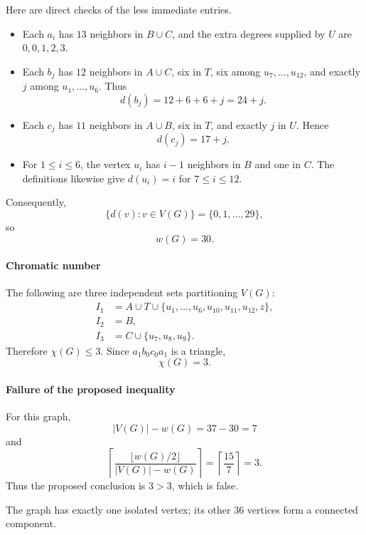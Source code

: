 \documentclass[
  11pt,
  a4paper,
]{article}
\providecommand{\tightlist}{%
  \setlength{\itemsep}{0pt}\setlength{\parskip}{0pt}}
\begin{document}
Here are direct checks of the less immediate entries.

\begin{itemize}
\tightlist
\item
  Each \(a_i\) has \(13\) neighbors in \(B\cup C\), and the extra
  degrees supplied by \(U\) are \(0,0,1,2,3\).
\item
  Each \(b_j\) has \(12\) neighbors in \(A\cup C\), six in \(T\), six
  among \(u_7,\ldots,u_{12}\), and exactly \(j\) among
  \(u_1,\ldots,u_6\). Thus \[
  d(b_j)=12+6+6+j=24+j.
  \]
\item
  Each \(c_j\) has \(11\) neighbors in \(A\cup B\), six in \(T\), and
  exactly \(j\) in \(U\). Hence \[
  d(c_j)=17+j.
  \]
\item
  For \(1\le i\le6\), the vertex \(u_i\) has \(i-1\) neighbors in \(B\)
  and one in \(C\). The definitions likewise give \(d(u_i)=i\) for
  \(7\le i\le12\).
\end{itemize}

Consequently, \[
\{d(v):v\in V(G)\}=\{0,1,\ldots,29\},
\] so \[
w(G)=30.
\]

\paragraph{Chromatic number}\label{chromatic-number}

The following are three independent sets partitioning \(V(G)\):
\begin{equation*}
\begin{aligned}
I_1&=A\cup T\cup\{u_1,\ldots,u_6,u_{10},u_{11},u_{12},z\},\\
I_2&=B,\\
I_3&=C\cup\{u_7,u_8,u_9\}.
\end{aligned}
\end{equation*} Therefore \(\chi(G)\le3\). Since \(a_1b_0c_0a_1\) is a
triangle, \[
\chi(G)=3.
\]

\paragraph{Failure of the proposed
inequality}\label{failure-of-the-proposed-inequality}

For this graph, \[
|V(G)|-w(G)=37-30=7
\] and \[
\left\lceil
\frac{\lfloor w(G)/2\rfloor}{|V(G)|-w(G)}
\right\rceil
=
\left\lceil\frac{15}{7}\right\rceil
=3.
\] Thus the proposed conclusion is \(3>3\), which is false.

The graph has exactly one isolated vertex; its other \(36\) vertices
form a connected component.
\end{document}
